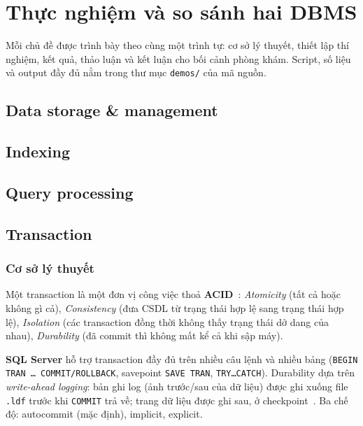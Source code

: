 \section{Thực nghiệm và so sánh hai DBMS}
\label{sec:demo}

Mỗi chủ đề được trình bày theo cùng một trình tự: cơ sở lý thuyết, thiết lập thí nghiệm, kết quả, thảo luận và kết luận cho bối cảnh phòng khám. Script, số liệu và output đầy đủ nằm trong thư mục \texttt{demos/} của mã nguồn.

\subsection{Data storage \& management}
\label{sec:storage}

\subsection{Indexing}
\label{sec:indexing}

\subsection{Query processing}
\label{sec:query}

\subsection{Transaction}
\label{sec:transaction}

\subsubsection{Cơ sở lý thuyết}
Một transaction là một đơn vị công việc thoả \textbf{ACID}~\cite{silberschatz}: \textit{Atomicity} (tất cả hoặc không gì cả), \textit{Consistency} (đưa CSDL từ trạng thái hợp lệ sang trạng thái hợp lệ), \textit{Isolation} (các transaction đồng thời không thấy trạng thái dở dang của nhau), \textit{Durability} (đã commit thì không mất kể cả khi sập máy).

\textbf{SQL Server} hỗ trợ transaction đầy đủ trên nhiều câu lệnh và nhiều bảng (\texttt{BEGIN TRAN \ldots{} COMMIT/ROLLBACK}, savepoint \texttt{SAVE TRAN}, \texttt{TRY\ldots CATCH}). Durability dựa trên \textit{write-ahead logging}: bản ghi log (ảnh trước/sau của dữ liệu) được ghi xuống file \texttt{.ldf} trước khi \texttt{COMMIT} trả về; trang dữ liệu được ghi sau, ở checkpoint~\cite{mssql-txlog}. Ba chế độ: autocommit (mặc định), implicit, explicit.

